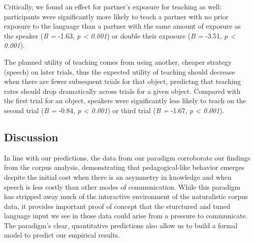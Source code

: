 \documentclass[10pt, letterpaper]{article}
\begin{document}
Critically, we found an effect for partner's exposure for teaching as
well: participants were significantly more likely to teach a partner
with no prior exposure to the language than a partner with the same
amount of exposure as the speaker (\emph{B =} -1.63, \emph{p \textless{}
0.001}) or double their exposure (\emph{B =} -3.51, \emph{p \textless{}
0.001}).

The planned utility of teaching comes from using another, cheaper
strategy (speech) on later trials, thus the expected utility of teaching
should decrease when there are fewer subsequent trials for that object,
predictng that teaching rates should drop dramatically across trials for
a given object. Compared with the first trial for an object, speakers
were significantly less likely to teach on the second trial (\emph{B =}
-0.84, \emph{p \textless{} 0.001}) or third trial (\emph{B =} -1.67,
\emph{p \textless{} 0.001}).

\subsection{Discussion}\label{discussion-1}

In line with our predictions, the data from our paradigm corroborate our
findings from the corpus analysis, demonstrating that pedagogical-like
behavior emerges despite the initial cost when there is an asymmetry in
knowledge and when speech is less costly than other modes of
communication. While this paradigm has stripped away much of the
interactive environment of the naturalistic corpus data, it provides
important proof of concept that the sturctured and tuned language input
we see in those data could arise from a pressure to communicate. The
paradigm's clear, quantitative predictions also allow us to build a
formal model to predict our empirical results.
\end{document}
